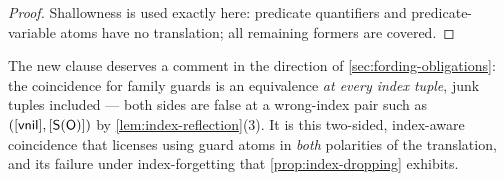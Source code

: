 \begin{proof}
Shallowness is used exactly here: predicate quantifiers and
predicate-variable atoms have no translation; all remaining formers are
covered.
\end{proof}

The new clause deserves a comment in the direction of
\cref{sec:fording-obligations}: the coincidence for family guards is an
equivalence \emph{at every index tuple}, junk tuples included --- both
sides are false at a wrong-index pair such as $([\mathsf{vnil}],
[\mathsf{S}(\mathsf{O})])$ by \cref{lem:index-reflection}(3).  It is this
two-sided, index-aware coincidence that licenses using guard atoms in
\emph{both} polarities of the translation, and its failure under
index-forgetting that \cref{prop:index-dropping} exhibits.
